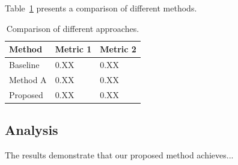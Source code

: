 \documentclass[runningheads]{llncs}
\begin{document}
Table~\ref{tab1} presents a comparison of different methods.

\begin{table}
\caption{Comparison of different approaches.}\label{tab1}
\begin{tabular}{|l|l|l|}
\hline
Method & Metric 1 & Metric 2\\
\hline
Baseline & 0.XX & 0.XX\\
Method A & 0.XX & 0.XX\\
Proposed & 0.XX & 0.XX\\
\hline
\end{tabular}
\end{table}





\subsection{Analysis}

The results demonstrate that our proposed method achieves...
\end{document}

